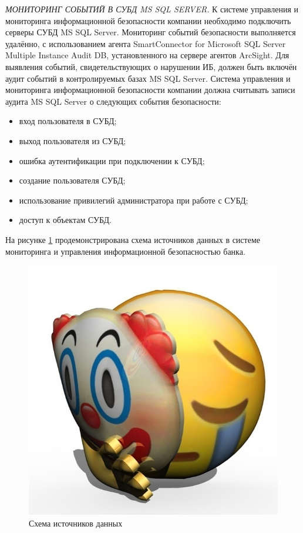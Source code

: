 \textit{МОНИТОРИНГ СОБЫТИЙ В СУБД MS SQL SERVER.}
К системе управления и мониторинга информационной безопасности компании необходимо подключить серверы СУБД MS SQL Server. Мониторинг событий безопасности выполняется удалённо, с использованием агента SmartConnector for Microsoft SQL Server Multiple Instance Audit DB, установленного на сервере агентов ArcSight.
Для выявления событий, свидетельствующих о нарушении ИБ, должен быть включён аудит событий в контролируемых базах MS SQL Server. Система управления и мониторинга информационной безопасности компании должна считывать записи аудита MS SQL Server о следующих события безопасности:
\begin{itemize}
    \item вход пользователя в СУБД;
    \item выход пользователя из СУБД;
    \item ошибка аутентификации при подключении к СУБД;
    \item создание пользователя СУБД;
    \item использование привилегий администратора при работе с СУБД;
    \item доступ к объектам СУБД.
\end{itemize}

На рисунке \ref{source} продемонстрирована схема источников данных в системе мониторинга и управления информационной безопасностью банка.
\begin{landscape}
\begin{figure}[H]
  \centering
  \includegraphics[width=1.3\textwidth]{image/4.jpg}
  \caption{Схема источников данных}
  \label{source}
\end{figure}
\end{landscape}

